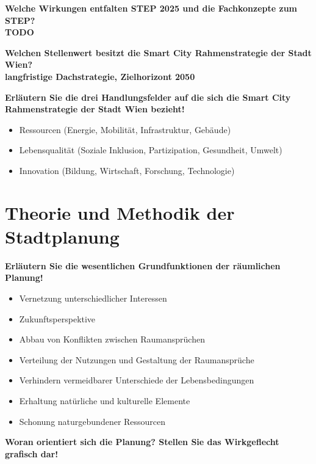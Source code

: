 \documentclass[]{article}
\newenvironment{question}{\vspace{8mm}\noindent\bfseries}{\\}
\begin{document}
\begin{question}
	Welche Wirkungen entfalten STEP 2025 und die Fachkonzepte zum STEP?
\end{question}
TODO

\begin{question}
	Welchen Stellenwert besitzt die Smart City Rahmenstrategie der Stadt Wien?
\end{question}
langfristige Dachstrategie, Zielhorizont 2050

\begin{question}
	Erläutern Sie die drei Handlungsfelder auf die sich die Smart City Rahmenstrategie der Stadt Wien bezieht!
\end{question}
\begin{itemize}
	\item Ressourcen (Energie, Mobilität, Infrastruktur, Gebäude)
	\item Lebensqualität (Soziale Inklusion, Partizipation, Gesundheit, Umwelt)
	\item Innovation (Bildung, Wirtschaft, Forschung, Technologie)
\end{itemize}

\section{Theorie und Methodik der Stadtplanung}
\begin{question}
	Erläutern Sie die wesentlichen Grundfunktionen der räumlichen Planung!
\end{question}

\begin{itemize}
	\item Vernetzung unterschiedlicher Interessen
	\item Zukunftsperspektive
	\item Abbau von Konflikten zwischen Raumansprüchen
	\item Verteilung der Nutzungen und Gestaltung der Raumansprüche
	\item Verhindern vermeidbarer Unterschiede der Lebensbedingungen
	\item Erhaltung natürliche und kulturelle Elemente
	\item Schonung naturgebundener Ressourcen
\end{itemize}


\begin{question}
	Woran orientiert sich die Planung? Stellen Sie das Wirkgeflecht grafisch dar!
\end{question}
\end{document}
